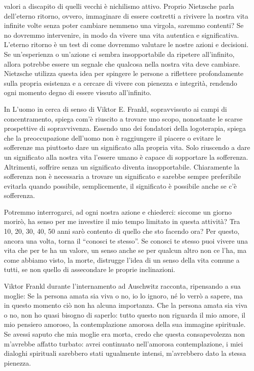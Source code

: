 \documentclass[12pt]{book} %
\begin{document}
valori a discapito di quelli vecchi è nichilismo attivo.
Proprio Nietzsche parla dell'eterno ritorno, ovvero, immaginare di essere costretti a rivivere la nostra vita infinite volte senza poter cambiare nemmeno una virgola, saremmo contenti? Se no dovremmo intervenire, in modo da vivere una vita autentica e significativa. L'eterno ritorno è un test di come dovremmo valutare le nostre azioni e decisioni. Se un'esperienza o un'azione ci sembra insopportabile da ripetere all'infinito, allora potrebbe essere un segnale che qualcosa nella nostra vita deve cambiare. Nietzsche utilizza questa idea per spingere le persone a riflettere profondamente sulla propria esistenza e a cercare di vivere con pienezza e integrità, rendendo ogni momento degno di essere vissuto all'infinito.

In L'uomo in cerca di senso di Viktor E. Frankl, sopravvissuto ai campi di
concentramento, spiega com'è riuscito a trovare uno scopo, nonostante le scarse prospettive di
sopravvivenza. Essendo uno dei fondatori della logoterapia, spiega che la preoccupazione dell'uomo non è raggiungere il
piacere o evitare le sofferenze ma piuttosto dare un significato alla propria vita. Solo riuscendo a dare un
significato alla nostra vita l'essere umano è capace di sopportare la sofferenza. Altrimenti,
soffrire senza un significato diventa insopportabile. Chiaramente la sofferenza non è necessaria a trovare un
significato e sarebbe sempre preferibile evitarla quando possibile, semplicemente, il significato è possibile anche se c'è sofferenza.

Potremmo interrogarci, ad ogni nostra azione e chiederci: siccome un giorno morirò, ha senso per me investire
il mio tempo limitato in questa attività? Tra 10, 20, 30, 40, 50 anni sarò contento di quello che sto facendo ora?
Per questo, ancora una volta, torna il “conosci te stesso”. Se conosci te
stesso puoi vivere una vita che per te ha un valore, un senso anche se per qualcun altro non ce
l'ha, ma come abbiamo visto, la morte, distrugge l'idea di un senso della
vita comune a tutti, se non quello di assecondare le proprie inclinazioni. 

Viktor Frankl durante l'internamento ad Auschwitz racconta, ripensando a sua moglie: Se la persona
amata sia viva o no, io lo ignoro, né lo verrò a sapere, ma in questo momento ciò non ha alcuna importanza. Che la
persona amata sia viva o no, non ho quasi bisogno di saperlo: tutto questo non riguarda il mio amore, il mio pensiero
amoroso, la contemplazione amorosa della sua immagine spirituale. Se avessi saputo che mia moglie era morta, credo che
questa consapevolezza non m'avrebbe affatto turbato: avrei continuato nell'amorosa contemplazione, i miei dialoghi
spirituali sarebbero stati ugualmente intensi, m'avrebbero dato la stessa pienezza. 
\end{document}
